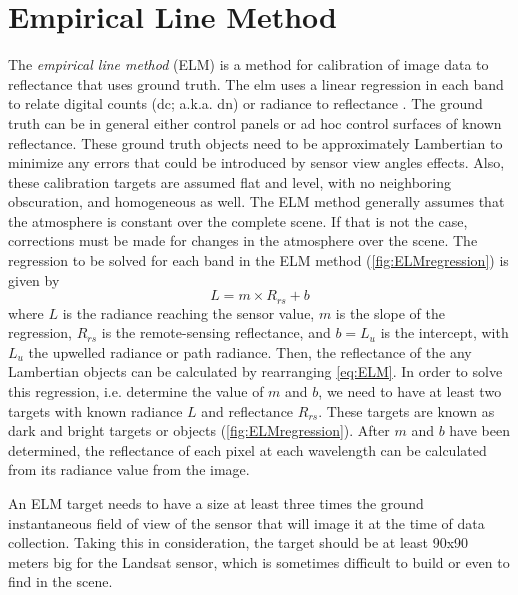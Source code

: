 \section{Empirical Line Method}
\label{sec:ELM}
The {\it empirical line method} (ELM) is a method for calibration of image data to reflectance that uses ground truth. The \acrshort{elm} uses a linear regression in each band to relate digital counts (\acrshort{dc}; a.k.a. \gls{dn}) or radiance to reflectance \cite{Schott,Smith:1999}. The ground truth can be in general  either control panels or ad hoc control surfaces of known reflectance. These ground truth objects need to be approximately Lambertian to minimize any errors that could be introduced by sensor view angles effects. Also, these calibration targets are assumed flat and level, with no neighboring obscuration, and homogeneous as well. The ELM method generally assumes that the atmosphere is constant over the complete scene. If that is not the case, corrections must be made for changes in the atmosphere over the scene. The regression to be solved for each band in the ELM method (\autoref{fig:ELMregression}) is given by
\begin{equation}
	\label{eq:ELM} 
	L = m\times R_{rs} + b
\end{equation}
where $L$ is the radiance reaching the sensor value, $m$ is the slope of the regression, $R_{rs}$ is the remote-sensing reflectance, and $b=L_u$ is the intercept, with $L_u$ the upwelled radiance or path radiance. Then, the reflectance of the any Lambertian objects can be calculated by rearranging \autoref{eq:ELM}. In order to solve this regression, i.e. determine the value of $m$ and $b$, we need to have at least two targets with known radiance $L$ and reflectance $R_{rs}$. These targets are known as dark and bright targets or objects (\autoref{fig:ELMregression}). After $m$ and $b$ have been determined, the reflectance of each pixel at each wavelength can be calculated from its radiance value from the image.

An ELM target needs to have a size at least three times the ground instantaneous field of view of the sensor that will image it at the time of data collection. Taking this in consideration, the target should be at least 90x90 meters big for the Landsat sensor, which is sometimes difficult to build or even to find in the scene. 

